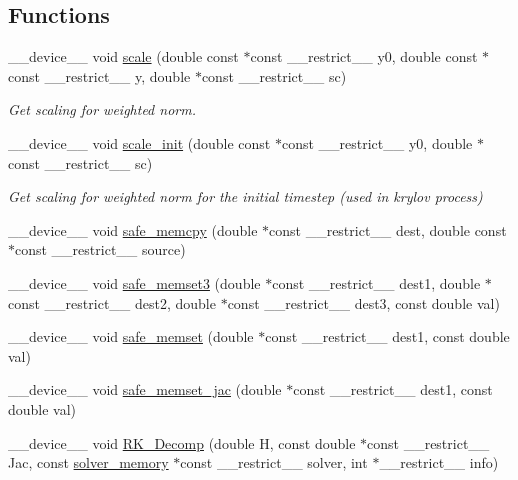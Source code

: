 \subsection*{Functions}
\begin{DoxyCompactItemize}
\item 
\+\_\+\+\_\+device\+\_\+\+\_\+ void \hyperlink{radau2a_8cu_a4fab5866449108992478041d2e51a28c}{scale} (double const $\ast$const \+\_\+\+\_\+restrict\+\_\+\+\_\+ y0, double const $\ast$const \+\_\+\+\_\+restrict\+\_\+\+\_\+ y, double $\ast$const \+\_\+\+\_\+restrict\+\_\+\+\_\+ sc)
\begin{DoxyCompactList}\small\item\em Get scaling for weighted norm. \end{DoxyCompactList}\item 
\+\_\+\+\_\+device\+\_\+\+\_\+ void \hyperlink{radau2a_8cu_a27a28cde87f3cbaf5f6adb19550a09a0}{scale\+\_\+init} (double const $\ast$const \+\_\+\+\_\+restrict\+\_\+\+\_\+ y0, double $\ast$const \+\_\+\+\_\+restrict\+\_\+\+\_\+ sc)
\begin{DoxyCompactList}\small\item\em Get scaling for weighted norm for the initial timestep (used in krylov process) \end{DoxyCompactList}\item 
\+\_\+\+\_\+device\+\_\+\+\_\+ void \hyperlink{radau2a_8cu_a3fe24b23317653f271f22f62bf2fd17f}{safe\+\_\+memcpy} (double $\ast$const \+\_\+\+\_\+restrict\+\_\+\+\_\+ dest, double const $\ast$const \+\_\+\+\_\+restrict\+\_\+\+\_\+ source)
\item 
\+\_\+\+\_\+device\+\_\+\+\_\+ void \hyperlink{radau2a_8cu_a8f00fd7d5d5da97d7faf474fcf545a6a}{safe\+\_\+memset3} (double $\ast$const \+\_\+\+\_\+restrict\+\_\+\+\_\+ dest1, double $\ast$const \+\_\+\+\_\+restrict\+\_\+\+\_\+ dest2, double $\ast$const \+\_\+\+\_\+restrict\+\_\+\+\_\+ dest3, const double val)
\item 
\+\_\+\+\_\+device\+\_\+\+\_\+ void \hyperlink{radau2a_8cu_aacde6c2050e1700429cc99df1cba83df}{safe\+\_\+memset} (double $\ast$const \+\_\+\+\_\+restrict\+\_\+\+\_\+ dest1, const double val)
\item 
\+\_\+\+\_\+device\+\_\+\+\_\+ void \hyperlink{radau2a_8cu_af04ced8f6b4fa62baf8371338878f408}{safe\+\_\+memset\+\_\+jac} (double $\ast$const \+\_\+\+\_\+restrict\+\_\+\+\_\+ dest1, const double val)
\item 
\+\_\+\+\_\+device\+\_\+\+\_\+ void \hyperlink{radau2a_8cu_adbea49bbab9b7a7f94204cc771919860}{R\+K\+\_\+\+Decomp} (double H, const double $\ast$const \+\_\+\+\_\+restrict\+\_\+\+\_\+ Jac, const \hyperlink{structsolver__memory}{solver\+\_\+memory} $\ast$const \+\_\+\+\_\+restrict\+\_\+\+\_\+ solver, int $\ast$\+\_\+\+\_\+restrict\+\_\+\+\_\+ info)

\end{DoxyCompactItemize}
